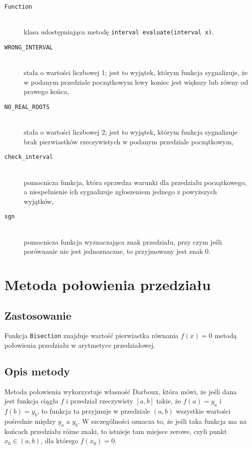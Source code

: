 \documentclass[12pt]{article}
\begin{document}
			\begin{description}
				\item[\texttt{Function}] \hfill\\
					klasa udostępniająca metodę \texttt{interval evaluate(interval x)}.
				\item[\texttt{WRONG\_INTERVAL}] \hfill\\
					stała o wartości liczbowej 1; jest to wyjątek, którym funkcja sygnalizuje, że w podanym przedziale początkowym lewy koniec jest większy lub równy od prawego końca,
				\item[\texttt{NO\_REAL\_ROOTS}] \hfill\\
					stała o wartości liczbowej 2; jest to wyjątek, którym funkcja sygnalizuje brak pierwiastków rzeczywistych w podanym przedziale początkowym,
				\item[\texttt{check\_interval}] \hfill\\
					pomocnicza funkcja, która sprawdza warunki dla przedziału początkowego, a niespełnienie ich sygnalizuje zgłoszeniem jednego z powyższych wyjątków,
        \item[\texttt{sgn}] \hfill\\
					pomocnicza funkcja wyznaczająca znak przedziału, przy czym jeśli porównanie nie jest jednoznaczne, to przyjmowany jest znak 0.
			\end{description}


	\section{Metoda połowienia przedziału}
		\subsection{Zastosowanie}
			Funkcja \texttt{Bisection} znajduje wartość pierwiastka równania
			$f(x) = 0$ metodą połowienia przedziału w arytmetyce przedziałowej.

		\subsection{Opis metody}
			Metoda połowienia wykorzystuje własność Darboux, która mówi,
			że jeśli dana jest funkcja ciągła $f$ i przedział rzeczywisty $[a, b]$ takie,
			że $f(a) = y_a$ i $f(b) = y_b$, to funkcja ta przyjmuje w przedziale $(a, b)$
			wszystkie wartości pośrednie między $y_a$ a $y_b$.
			W szczególności oznacza to, że jeśli taka funkcja ma
			na końcach przedziału różne znaki, to istnieje tam miejsce zerowe,
			czyli punkt $x_0 \in (a, b)$, dla którego $f(x_0) = 0$.
\end{document}
